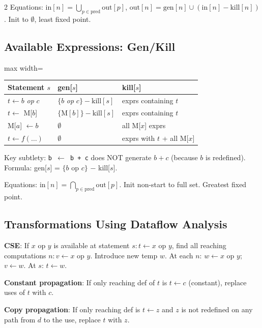 \documentclass[9pt,landscape]{extarticle}
\begin{document}
\begin{multicols}{2}
Equations: $\text{in}[n] = \bigcup_{p \in \text{pred}} \text{out}[p]$, \quad $\text{out}[n] = \text{gen}[n] \cup (\text{in}[n] - \text{kill}[n])$. Init to $\emptyset$, least fixed point.

\subsection{Available Expressions: Gen/Kill}

\begin{adjustbox}{max width=\columnwidth}
\begin{tabular}{@{}lll@{}}
\textbf{Statement $s$} & \textbf{gen[$s$]} & \textbf{kill[$s$]} \\
\hline
$t \leftarrow b$ \textit{op} $c$ & $\{b$ \textit{op} $c\} - \text{kill}[s]$ & exprs containing $t$ \\
$t \leftarrow$ M[$b$] & $\{\text{M}[b]\} - \text{kill}[s]$ & exprs containing $t$ \\
M[$a$] $\leftarrow b$ & $\emptyset$ & all M[$x$] exprs \\
$t \leftarrow f(\ldots)$ & $\emptyset$ & exprs with $t$ + all M[$x$] \\
\end{tabular}
\end{adjustbox}

Key subtlety: \texttt{b $\leftarrow$ b + c} does NOT generate $b + c$ (because $b$ is redefined). Formula: gen[$s$] = $\{b$ op $c\}$ $-$ kill[$s$].

Equations: $\text{in}[n] = \bigcap_{p \in \text{pred}} \text{out}[p]$. Init non-start to full set. Greatest fixed point.

\subsection{Transformations Using Dataflow Analysis}

\textbf{CSE}: If $x$ op $y$ is available at statement $s: t \leftarrow x$ op $y$, find all reaching computations $n: v \leftarrow x$ op $y$. Introduce new temp $w$. At each $n$: $w \leftarrow x$ op $y$; $v \leftarrow w$. At $s$: $t \leftarrow w$.

\textbf{Constant propagation}: If only reaching def of $t$ is $t \leftarrow c$ (constant), replace uses of $t$ with $c$.

\textbf{Copy propagation}: If only reaching def is $t \leftarrow z$ and $z$ is not redefined on any path from $d$ to the use, replace $t$ with $z$.


\end{multicols}
\end{document}
